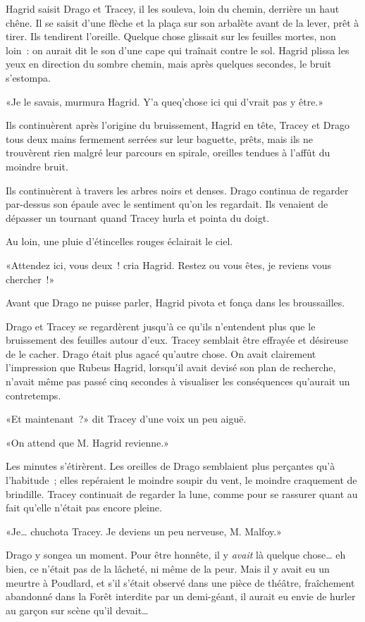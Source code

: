 Hagrid saisit Drago et Tracey, il les souleva, loin du chemin, derrière un haut chêne. Il se saisit d'une flèche et la plaça sur son arbalète avant de la lever, prêt à tirer. Ils tendirent l'oreille. Quelque chose glissait sur les feuilles mortes, non loin~: on aurait dit le son d'une cape qui traînait contre le sol. Hagrid plissa les yeux en direction du sombre chemin, mais après quelques secondes, le bruit s'estompa.

«Je le savais, murmura Hagrid. Y'a queq'chose ici qui d'vrait pas y être.»

Ils continuèrent après l'origine du bruissement, Hagrid en tête, Tracey et Drago tous deux mains fermement serrées sur leur baguette, prêts, mais ils ne trouvèrent rien malgré leur parcours en spirale, oreilles tendues à l'affût du moindre bruit.

Ils continuèrent à travers les arbres noirs et denses. Drago continua de regarder par-dessus son épaule avec le sentiment qu'on les regardait. Ils venaient de dépasser un tournant quand Tracey hurla et pointa du doigt.

Au loin, une pluie d'étincelles rouges éclairait le ciel.

«Attendez ici, vous deux~! cria Hagrid. Restez ou vous êtes, je reviens vous chercher~!»

Avant que Drago ne puisse parler, Hagrid pivota et fonça dans les broussailles.

Drago et Tracey se regardèrent jusqu'à ce qu'ils n'entendent plus que le bruissement des feuilles autour d'eux. Tracey semblait être effrayée et désireuse de le cacher. Drago était plus agacé qu'autre chose. On avait clairement l'impression que Rubeus Hagrid, lorsqu'il avait devisé son plan de recherche, n'avait même pas passé cinq secondes à visualiser les conséquences qu'aurait un contretemps.

«Et maintenant~?» dit Tracey d'une voix un peu aiguë.

«On attend que M. Hagrid revienne.»

Les minutes s'étirèrent. Les oreilles de Drago semblaient plus perçantes qu'à l'habitude~; elles repéraient le moindre soupir du vent, le moindre craquement de brindille. Tracey continuait de regarder la lune, comme pour se rassurer quant au fait qu'elle n'était pas encore pleine.

«Je… chuchota Tracey. Je deviens un peu nerveuse, M. Malfoy.»

Drago y songea un moment. Pour être honnête, il y \emph{avait} là quelque chose… eh bien, ce n'était pas de la lâcheté, ni même de la peur. Mais il y avait eu un meurtre à Poudlard, et s'il s'était observé dans une pièce de théâtre, fraîchement abandonné dans la Forêt interdite par un demi-géant, il aurait eu envie de hurler au garçon sur scène qu'il devait…

